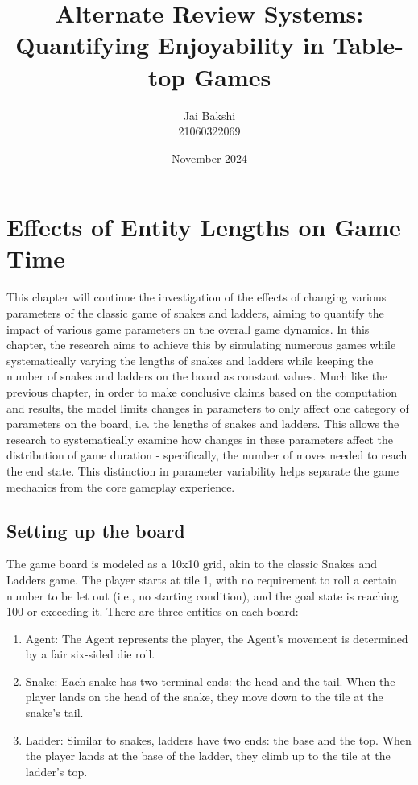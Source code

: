 \documentclass[12pt]{report}
\title{Alternate Review Systems:\\ Quantifying Enjoyability in Table-top Games}
\author{Jai Bakshi \\ 21060322069}
\date{November 2024}
\begin{document}
	\maketitle
	\setcounter{chapter}{1}
	\chapter{Effects of Entity Lengths on Game Time}
	This chapter will continue the investigation of the effects of changing various parameters of the classic game of snakes and ladders, aiming to quantify the impact of various game parameters on the overall game dynamics. In this chapter, the research aims to achieve this by simulating numerous games while systematically varying the lengths of snakes and ladders while keeping the number of snakes and ladders on the board as constant values. Much like the previous chapter, in order to make conclusive claims based on the computation and results, the model limits changes in parameters to only affect one category of parameters on the board, i.e. the lengths of snakes and ladders. This allows the research to systematically examine how changes in these parameters affect the distribution of game duration - specifically, the number of moves needed to reach the end state. This distinction in parameter variability helps separate the game mechanics from the core gameplay experience.
	
	\section{Setting up the board}
	The game board is modeled as a 10x10 grid, akin to the classic Snakes and Ladders game. The player starts at tile 1, with no requirement to roll a certain number to be let out (i.e., no starting condition), and the goal state is reaching 100 or exceeding it. There are three entities on each board:

	\begin{enumerate}
		\item Agent: The Agent represents the player, the Agent's movement is determined by a fair six-sided die roll. 
		\item Snake: Each snake has two terminal ends: the head and the tail. When the player lands on the head of the snake, they move down to the tile at the snake's tail.
		\item Ladder: Similar to snakes, ladders have two ends: the base and the top. When the player lands at the base of the ladder, they climb up to the tile at the ladder's top.
	\end{enumerate}
\end{document}
